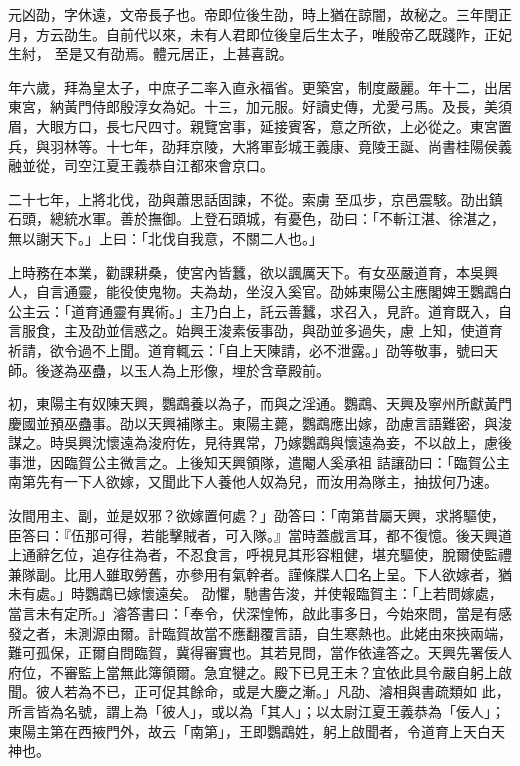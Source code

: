 
\begin{pinyinscope}

 元凶劭，字休遠，文帝長子也。帝即位後生劭，時上猶在諒闇，故秘之。三年閏正月，方云劭生。自前代以來，未有人君即位後皇后生太子，唯殷帝乙既踐阼，正妃生紂，
 至是又有劭焉。體元居正，上甚喜說。



 年六歲，拜為皇太子，中庶子二率入直永福省。更築宮，制度嚴麗。年十二，出居東宮，納黃門侍郎殷淳女為妃。十三，加元服。好讀史傳，尤愛弓馬。及長，美須眉，大眼方口，長七尺四寸。親覽宮事，延接賓客，意之所欲，上必從之。東宮置兵，與羽林等。十七年，劭拜京陵，大將軍彭城王義康、竟陵王誕、尚書桂陽侯義融並從，司空江夏王義恭自江都來會京口。



 二十七年，上將北伐，劭與蕭思話固諫，不從。索虜
 至瓜步，京邑震駭。劭出鎮石頭，總統水軍。善於撫御。上登石頭城，有憂色，劭曰：「不斬江湛、徐湛之，無以謝天下。」上曰：「北伐自我意，不關二人也。」



 上時務在本業，勸課耕桑，使宮內皆蠶，欲以諷厲天下。有女巫嚴道育，本吳興人，自言通靈，能役使鬼物。夫為劫，坐沒入奚官。劭姊東陽公主應閣婢王鸚鵡白公主云：「道育通靈有異術。」主乃白上，託云善蠶，求召入，見許。道育既入，自言服食，主及劭並信惑之。始興王浚素佞事劭，與劭並多過失，慮
 上知，使道育祈請，欲令過不上聞。道育輒云：「自上天陳請，必不泄露。」劭等敬事，號曰天師。後遂為巫蠱，以玉人為上形像，埋於含章殿前。



 初，東陽主有奴陳天興，鸚鵡養以為子，而與之淫通。鸚鵡、天興及寧州所獻黃門慶國並預巫蠱事。劭以天興補隊主。東陽主薨，鸚鵡應出嫁，劭慮言語難密，與浚謀之。時吳興沈懷遠為浚府佐，見待異常，乃嫁鸚鵡與懷遠為妾，不以啟上，慮後事泄，因臨賀公主微言之。上後知天興領隊，遣閹人奚承祖
 詰讓劭曰：「臨賀公主南第先有一下人欲嫁，又聞此下人養他人奴為兒，而汝用為隊主，抽拔何乃速。



 汝間用主、副，並是奴邪？欲嫁置何處？」劭答曰：「南第昔屬天興，求將驅使，臣答曰：『伍那可得，若能擊賊者，可入隊。』當時蓋戲言耳，都不復憶。後天興道上通辭乞位，追存往為者，不忍食言，呼視見其形容粗健，堪充驅使，脫爾使監禮兼隊副。比用人雖取勞舊，亦參用有氣幹者。謹條牒人囗名上呈。下人欲嫁者，猶未有處。」時鸚鵡已嫁懷遠矣。
 劭懼，馳書告浚，并使報臨賀主：「上若問嫁處，當言未有定所。」濬答書曰：「奉令，伏深惶怖，啟此事多日，今始來問，當是有感發之者，未測源由爾。計臨賀故當不應翻覆言語，自生寒熱也。此姥由來挾兩端，難可孤保，正爾自問臨賀，冀得審實也。其若見問，當作依違答之。天興先署佞人府位，不審監上當無此簿領爾。急宜犍之。殿下已見王未？宜依此具令嚴自躬上啟聞。彼人若為不已，正可促其餘命，或是大慶之漸。」凡劭、濬相與書疏類如
 此，所言皆為名號，謂上為「彼人」，或以為「其人」；以太尉江夏王義恭為「佞人」；東陽主第在西掖門外，故云「南第」，王即鸚鵡姓，躬上啟聞者，令道育上天白天神也。




\end{pinyinscope}

